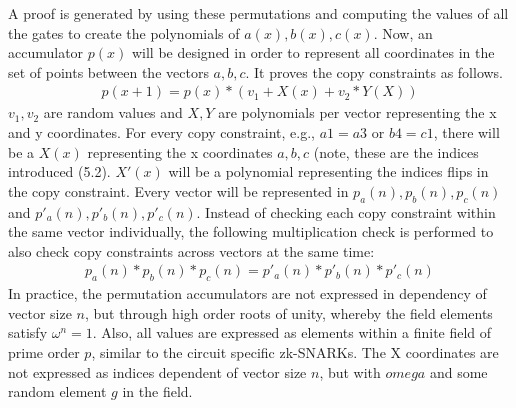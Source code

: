 A proof is generated by using these permutations and computing the values of all the gates to create the polynomials of \(a(x), b(x), c(x)\). Now, an accumulator \(p(x)\) will be designed in order to represent all coordinates in the set of points between the vectors \(a, b, c\). It proves the copy constraints as follows.
\begin{align}
    p(x+1) = p(x) * (v_1 + X(x) + v_2 * Y(X))
\end{align}
\(v_1, v_2\) are random values and \(X, Y\) are polynomials per vector representing the x and y coordinates. For every copy constraint, e.g., \(a1=a3\) or \(b4=c1\), there will be a \(X(x)\) representing the x coordinates \(a,b ,c\) (note, these are the indices introduced (5.2). \(X'(x)\) will be a polynomial representing the indices flips in the copy constraint. Every vector will be represented in \(p_{a}(n), p_{b}(n), p_{c}(n)\) and \(p'_{a}(n), p'_{b}(n), p'_{c}(n)\). Instead of checking each copy constraint within the same vector individually, the following multiplication check is performed to also check copy constraints across vectors at the same time:
\begin{align}
    p_{a}(n) * p_{b}(n) * p_{c}(n) = p'_{a}(n) * p'_{b}(n) * p'_{c}(n)
\end{align}
In practice, the permutation accumulators are not expressed in dependency of vector size \(n\), but through high order roots of unity, whereby the field elements satisfy \(\omega^n = 1\). Also, all values are expressed as elements within a finite field of prime order \(p\), similar to the circuit specific zk-SNARKs. The X coordinates are not expressed as indices dependent of vector size \(n\), but with \(omega\) and some random element \(g\) in the field.
